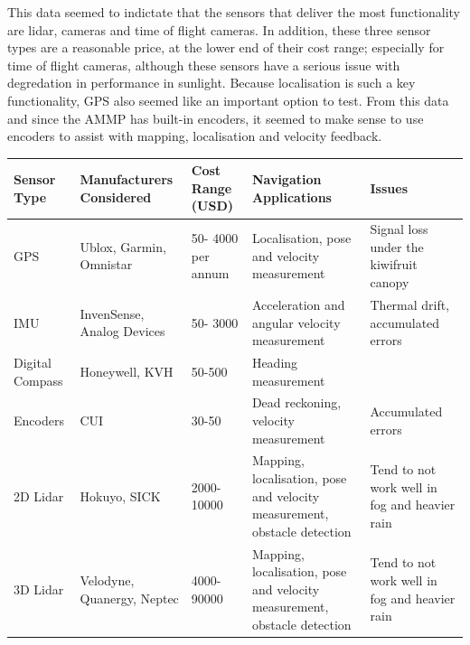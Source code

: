 \documentclass[preprint,authoryear,12pt]{elsarticle}
\begin{document}
    This data seemed to indictate that the sensors that deliver the most functionality are lidar, cameras and time of flight cameras. In addition, these three sensor types are a reasonable price, at the lower end of their cost range; especially for time of flight cameras, although these sensors have a serious issue with degredation in performance in sunlight. Because localisation is such a key functionality, GPS also seemed like an important option to test. From this data and since the AMMP has built-in encoders, it seemed to make sense to use encoders to assist with mapping, localisation and velocity feedback. 

    \begin{table}[h!]
        \centering
        \begin{tabular}{ | m{1.4cm} | m{2.9cm}| m{1.4cm} | m{2.9cm} | m{2.9cm} } 
            \hline
            \scriptsize \textbf{Sensor Type} & \scriptsize \textbf{Manufacturers Considered} &\scriptsize \textbf{Cost Range (USD)} &\scriptsize \textbf{Navigation Applications} &\scriptsize \textbf{Issues} \\
            \hline
            \scriptsize GPS & \scriptsize Ublox, Garmin, Omnistar & \scriptsize 50- 4000 per annum & \scriptsize Localisation, pose and velocity measurement &\scriptsize Signal loss under the kiwifruit canopy \\ 
            \hline
            \scriptsize IMU & \scriptsize InvenSense, Analog Devices & \scriptsize 50- 3000 & \scriptsize Acceleration and angular velocity measurement & \scriptsize Thermal drift, accumulated errors \\
            \hline
            \scriptsize Digital Compass & \scriptsize Honeywell, KVH & \scriptsize 50-500 & \scriptsize Heading measurement & \scriptsize \\
            \hline
            \scriptsize Encoders & \scriptsize CUI & \scriptsize 30-50 & \scriptsize Dead reckoning, velocity measurement & \scriptsize Accumulated errors \\
            \hline
            \scriptsize 2D Lidar & \scriptsize Hokuyo, SICK & \scriptsize 2000-10000 & \scriptsize Mapping, localisation, pose and velocity measurement, obstacle detection & \scriptsize Tend to not work well in fog and heavier rain \\
            \hline
            \scriptsize 3D Lidar & \scriptsize Velodyne, Quanergy, Neptec & \scriptsize 4000-90000 & \scriptsize Mapping, localisation, pose and velocity measurement, obstacle detection & \scriptsize Tend to not work well in fog and heavier rain \\

\end{tabular}
\end{table}
\end{document}
